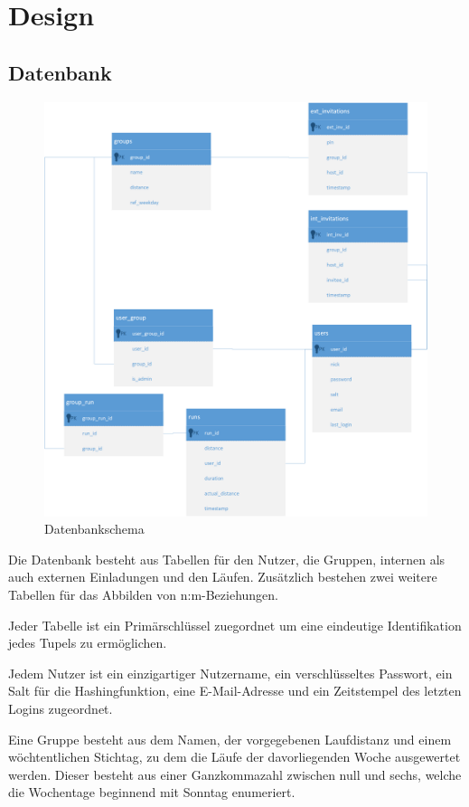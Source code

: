 \section{Design}\label{kapitel5}
\subsection{Datenbank}
\begin{figure}[!h]
\centering
\includegraphics[width=\textwidth]{abb/er_diagram}
\caption{Datenbankschema}
\end{figure}
Die Datenbank besteht aus Tabellen für den Nutzer, die Gruppen, internen als auch externen Einladungen und den Läufen. Zusätzlich bestehen zwei weitere Tabellen für das Abbilden von n:m-Beziehungen.

Jeder Tabelle ist ein Primärschlüssel zuegordnet um eine eindeutige Identifikation jedes Tupels zu ermöglichen.

Jedem Nutzer ist ein einzigartiger Nutzername, ein verschlüsseltes Passwort, ein Salt für die Hashingfunktion, eine E-Mail-Adresse und ein Zeitstempel des letzten Logins zugeordnet.

Eine Gruppe besteht aus dem Namen, der vorgegebenen Laufdistanz und einem wöchtentlichen Stichtag, zu dem die Läufe der davorliegenden Woche ausgewertet werden. Dieser besteht aus einer Ganzkommazahl zwischen null und sechs, welche die Wochentage beginnend mit Sonntag enumeriert.

